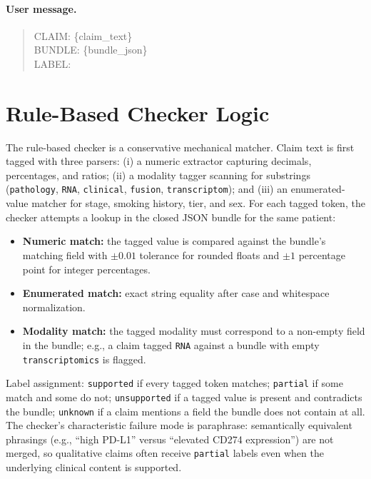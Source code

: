 \documentclass{article}
\theoremstyle{plain}
\begin{document}
\paragraph{User message.}
\begin{quote}\small\ttfamily
CLAIM: \{claim\_text\}\\
BUNDLE: \{bundle\_json\}\\
LABEL:
\end{quote}

\section{Rule-Based Checker Logic}
\label{app:rulechecker}

The rule-based checker is a conservative mechanical matcher. Claim text is first tagged with three parsers: (i) a numeric extractor capturing decimals, percentages, and ratios; (ii) a modality tagger scanning for substrings (\texttt{pathology}, \texttt{RNA}, \texttt{clinical}, \texttt{fusion}, \texttt{transcriptom}); and (iii) an enumerated-value matcher for stage, smoking history, tier, and sex. For each tagged token, the checker attempts a lookup in the closed JSON bundle for the same patient:

\begin{itemize}
\item \textbf{Numeric match:} the tagged value is compared against the bundle's matching field with $\pm 0.01$ tolerance for rounded floats and $\pm 1$ percentage point for integer percentages.
\item \textbf{Enumerated match:} exact string equality after case and whitespace normalization.
\item \textbf{Modality match:} the tagged modality must correspond to a non-empty field in the bundle; e.g., a claim tagged \texttt{RNA} against a bundle with empty \texttt{transcriptomics} is flagged.
\end{itemize}

Label assignment: \texttt{supported} if every tagged token matches; \texttt{partial} if some match and some do not; \texttt{unsupported} if a tagged value is present and contradicts the bundle; \texttt{unknown} if a claim mentions a field the bundle does not contain at all. The checker's characteristic failure mode is paraphrase: semantically equivalent phrasings (e.g., ``high PD-L1'' versus ``elevated CD274 expression'') are not merged, so qualitative claims often receive \texttt{partial} labels even when the underlying clinical content is supported.
\end{document}
